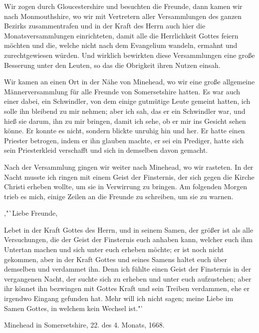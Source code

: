 Wir zogen durch Gloucestershire und besuchten die Freunde,
dann kamen wir nach Monmouthshire, wo wir mit Vertretern
aller Versammlungen des ganzen Bezirks zusammentrafen und in
der Kraft des Herrn auch hier die Monatsversammlungen 
einrichteten, damit alle die Herrlichkeit Gottes feiern möchten und
die, welche nicht nach dem Evangelium wandeln, ermahnt und
zurechtgewiesen würden. Und wirklich bewirkten diese 
Versammlungen eine große Besserung unter den Leuten, so das die 
Obrigkeit ihren Nutzen einsah.

Wir kamen an einen Ort in der Nähe von Minehead, wo
wir eine große allgemeine Männerversammlung für alle Freunde
von Somersetshire hatten. Es war auch einer dabei, ein
Schwindler, von dem einige gutmütige Leute gemeint hatten, ich
solle ihn bleibend zu mir nehmen; aber ich sah, das er ein
Schwindler war, und hieß sie darum, ihn zu mir bringen, damit
ich sehe, ob er mir ins Gesicht sehen könne. Er konnte es
nicht, sondern blickte unruhig hin und her. Er hatte einen
Priester betrogen, indem er ihn glauben machte, er sei ein 
Prediger, hatte sich sein Priesterkleid verschafft und sich in demselben
davon gemacht.

Nach der Versammlung gingen wir weiter nach Minehead,
wo wir rasteten. In der Nacht musste ich ringen mit einem
Geist der Finsternis, der sich gegen die Kirche Christi erheben
wollte, um sie in Verwirrung zu bringen. Am folgenden Morgen
trieb es mich, einige Zeilen an die Freunde zu schreiben, um sie
zu warnen.

,"`Liebe Freunde,

Lebet in der Kraft Gottes des Herrn, und in seinem Samen,
der größer ist als alle Versuchungen, die der Geist der Finsternis
euch anhaben kann, welcher euch ihm Untertan machen und sich
unter euch erheben möchte; er ist noch nicht gekommen, aber in
der Kraft Gottes und seines Samens haltet euch über demselben
und verdammet ihn. Denn ich fühlte einen Geist der Finsternis in
der vergangenen Nacht, der suchte sich zu erheben und unter euch
aufzustehen; aber ihr könnet ihn bezwingen mit Gottes Kraft und
sein Treiben verdammen, ehe er irgendwo Eingang gefunden
hat. Mehr will ich nicht sagen; meine Liebe im Samen Gottes,
in welchem kein Wechsel ist."'

Minehead in Somersetshire, 22. des 4. Monats, 1668.

